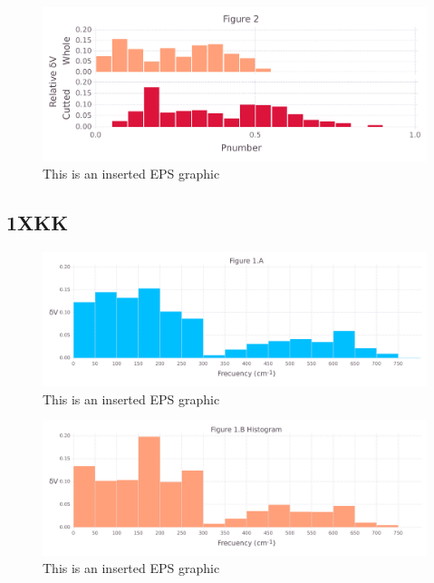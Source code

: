 \documentclass[10pt,letterpaper]{article}
\begin{document}
\begin{figure}[ht]
\begin{center}
\includegraphics[scale=0.5]{1hvr_hol/3both_figure_very_hi-precision.pdf}
\caption{This is an inserted EPS graphic}
\label{fig13}
\end{center}
\end{figure}

\FloatBarrier
\newpage

\subsection{1XKK}

\begin{figure}[ht]
\begin{center}
\includegraphics[scale=0.5]{1xkk/1afigure_very_hi-precision.pdf}
\caption{This is an inserted EPS graphic}
\label{fig1}
\end{center}
\end{figure}

\begin{figure}[ht]
\begin{center}
\includegraphics[scale=0.5]{1xkk/1bfigure_very_hi-precision.pdf}
\caption{This is an inserted EPS graphic}
\label{fig2}
\end{center}
\end{figure}
\end{document}

